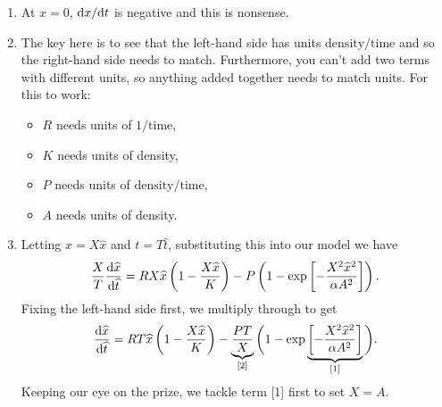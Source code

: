 \documentclass[a4paper,12pt]{article}
\newcommand{\xh}{\hat{x}}
\renewcommand{\th}{\hat{t}}
\begin{document}
\begin{enumerate}
{\begin{enumerate}
{        Other issues: again $K$ was not often precisely enough defined. The logistic term was sometimes described as linear, when it is quadratic. This seems to be because ChatGPT describes the `growth rate per capita', which would indeed be linear: be careful!
        }
        
        \item At $x=0$, $\fd{x}{t}$ is negative and this is nonsense.
        
        
        \item The key here is to see that the left-hand side has units $\text{density}/\text{time}$ and so the right-hand side needs to match. Furthermore, you can't add two terms with different units, so anything added together needs to match units. For this to work:
          \begin{itemize}
            \item $R$ needs units of $1/\text{time}$,
            \item $K$ needs units of density,
            \item $P$ needs units of $\text{density}/\text{time}$,
            \item $A$ needs units of density.
          \end{itemize}

        \item Letting $x=X\xh$ and $t=T\th$, substituting this into our model we have
          \begin{equation}
            \frac{X}{T} \fd{\xh}{\th} = RX \xh \left( 1- \frac{X\xh}{K}\right) - P\left( 1 - \exp\left[-\frac{X^2\xh^2}{\alpha A^2}\right] \right).
          \end{equation}
          Fixing the left-hand side first, we multiply through to get
          \begin{equation}
            \fd{\xh}{\th} = RT \xh \left( 1- \frac{X\xh}{K}\right) - \underbrace{\frac{PT}{X}}_{[2]} \bigg( 1 - \exp\underbrace{\left[-\frac{X^2\xh^2}{\alpha A^2}\right]}_{[1]} \bigg).
          \end{equation}
          Keeping our eye on the prize, we tackle term [1] first to set $X=A$.


\end{enumerate}}
\end{enumerate}
\end{document}
